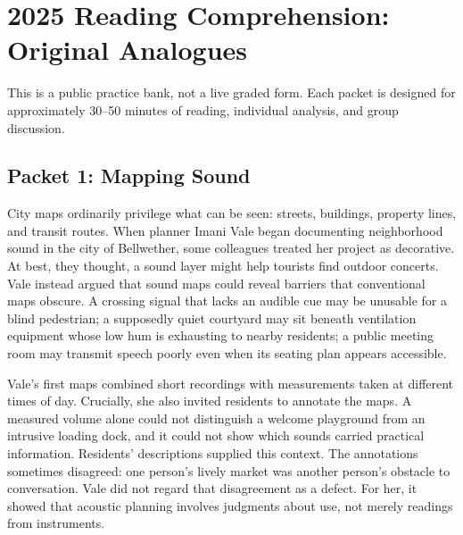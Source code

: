 
\section*{2025 Reading Comprehension: Original Analogues}

\begin{center}
\end{center}

\noindent This is a public practice bank, not a live graded form. Each packet is designed for approximately 30--50 minutes of reading, individual analysis, and group discussion.

\subsection*{Packet 1: Mapping Sound}

City maps ordinarily privilege what can be seen: streets, buildings, property lines, and transit routes. When planner Imani Vale began documenting neighborhood sound in the city of Bellwether, some colleagues treated her project as decorative. At best, they thought, a sound layer might help tourists find outdoor concerts. Vale instead argued that sound maps could reveal barriers that conventional maps obscure. A crossing signal that lacks an audible cue may be unusable for a blind pedestrian; a supposedly quiet courtyard may sit beneath ventilation equipment whose low hum is exhausting to nearby residents; a public meeting room may transmit speech poorly even when its seating plan appears accessible.

Vale's first maps combined short recordings with measurements taken at different times of day. Crucially, she also invited residents to annotate the maps. A measured volume alone could not distinguish a welcome playground from an intrusive loading dock, and it could not show which sounds carried practical information. Residents' descriptions supplied this context. The annotations sometimes disagreed: one person's lively market was another person's obstacle to conversation. Vale did not regard that disagreement as a defect. For her, it showed that acoustic planning involves judgments about use, not merely readings from instruments.


